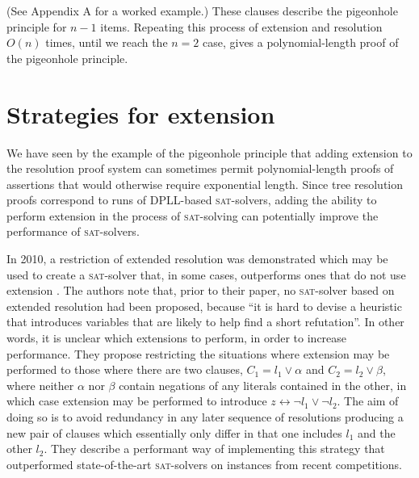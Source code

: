 \documentclass[proof,pdftex,11pt,a4,titlepage]{article}
\newcommand{\sat}{\textsc{sat}}
\begin{document}
(See Appendix A for a worked example.) These clauses describe the pigeonhole principle for $n-1$ items. Repeating this process of extension and resolution $O(n)$ times, until we reach the $n=2$ case, gives a polynomial-length proof of the pigeonhole principle.

\section{Strategies for extension}

We have seen by the example of the pigeonhole principle that adding extension to the resolution proof system can sometimes permit polynomial-length proofs of assertions that would otherwise require exponential length. Since tree resolution proofs correspond to runs of DPLL-based \sat{}-solvers, adding the ability to perform extension in the process of \sat{}-solving can potentially improve the performance of \sat{}-solvers.

In 2010, a restriction of extended resolution was demonstrated which may be used to create a \sat{}-solver that, in some cases, outperforms ones that do not use extension \cite{Audemard:2010}. The authors note that, prior to their paper, no \sat{}-solver based on extended resolution had been proposed, because ``it is hard to devise a heuristic that introduces variables that are likely to help find a short refutation''. In other words, it is unclear which extensions to perform, in order to increase performance. They propose restricting the situations where extension may be performed to those where there are two clauses, $C_1 = l_1 \vee \alpha$ and $C_2 = l_2 \vee \beta$, where neither $\alpha$ nor $\beta$ contain negations of any literals contained in the other, in which case extension may be performed to introduce $z \leftrightarrow \neg l_1 \vee \neg l_2$. The aim of doing so is to avoid redundancy in any later sequence of resolutions producing a new pair of clauses which essentially only differ in that one includes $l_1$ and the other $l_2$. They describe a performant way of implementing this strategy that outperformed state-of-the-art \sat{}-solvers on instances from recent competitions.
\end{document}
